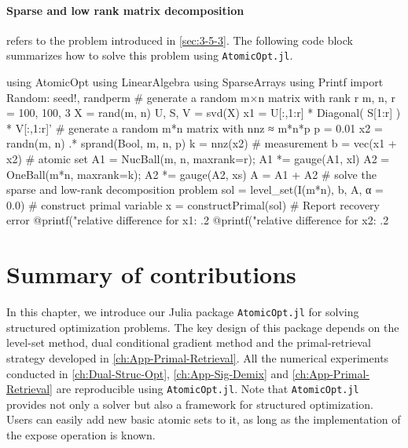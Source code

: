 \paragraph{Sparse and low rank matrix decomposition} refers to the problem introduced in \autoref{sec:3-5-3}. The following code block summarizes how to solve this problem using \texttt{AtomicOpt.jl}.
\begin{code}
  using AtomicOpt
  using LinearAlgebra
  using SparseArrays
  using Printf
  import Random: seed!, randperm
  # generate a random m×n matrix with rank r
  m, n, r = 100, 100, 3 
  X = rand(m, n)
  U, S, V = svd(X)
  x1 = U[:,1:r] * Diagonal( S[1:r] ) * V[:,1:r]'
  # generate a random m*n matrix with nnz ≈ m*n*p
  p = 0.01
  x2 = randn(m, n) .* sprand(Bool, m, n, p)
  k = nnz(x2)
  # measurement
  b = vec(x1 + x2)
  # atomic set
  A1 = NucBall(m, n, maxrank=r); A1 *= gauge(A1, xl)
  A2 = OneBall(m*n, maxrank=k); A2 *= gauge(A2, xs)
  A = A1 + A2
  # solve the sparse and low-rank decomposition problem
  sol = level_set(I(m*n), b, A, α = 0.0)
  # construct primal variable
  x = constructPrimal(sol)
  # Report recovery error
  @printf("relative difference for x1: .2%
  @printf("relative difference for x2: .2%
\end{code}


\section{Summary of contributions} \label{sec:5-5} 
In this chapter, we introduce our Julia package \texttt{AtomicOpt.jl} for solving structured optimization problems. The key design of this package depends on the level-set method, dual conditional gradient method and the primal-retrieval strategy developed in \autoref{ch:App-Primal-Retrieval}. All the numerical experiments conducted in \autoref{ch:Dual-Struc-Opt}, \autoref{ch:App-Sig-Demix} and \autoref{ch:App-Primal-Retrieval} are reproducible using \texttt{AtomicOpt.jl}. Note that \texttt{AtomicOpt.jl} provides not only a solver but also a framework for structured optimization. Users can easily add new basic atomic sets to it, as long as the implementation of the expose operation is known. 









